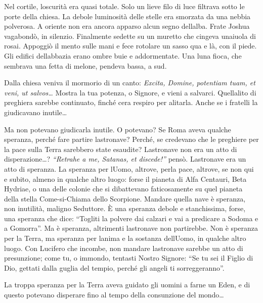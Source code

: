 Nel cortile, l\textquotesingle oscurità era quasi totale. Solo un lieve
filo di luce filtrava sotto le porte della chiesa. La debole luminosità
delle stelle era smorzata da una nebbia polverosa. A oriente non era
ancora apparso alcun segno dell\textquotesingle alba. Frate Joshua
vagabondò, in silenzio. Finalmente sedette su un muretto che cingeva
un\textquotesingle aiuola di rosai. Appoggiò il mento sulle mani e fece
rotolare un sasso qua e là, con il piede. Gli edifici
dell\textquotesingle abbazia erano ombre buie e addormentate. Una luna
fioca, che sembrava una fetta di melone, pendeva bassa, a sud.

Dalla chiesa veniva il mormorio di un canto: \emph{Excita, Domine,
	potentiam tuam, et veni, ut salvos\ldots{}} Mostra la tua potenza, o
Signore, e vieni a salvarci. Quell\textquotesingle alito di preghiera
sarebbe continuato, finché c\textquotesingle era respiro per alitarla.
Anche se i fratelli la giudicavano inutile\ldots{}

Ma non potevano giudicarla inutile. O potevano? Se Roma aveva qualche
speranza, perché fare partire l\textquotesingle astronave? Perché, se
credevano che le preghiere per la pace sulla Terra sarebbero state
esaudite? L\textquotesingle astronave non era un atto di
disperazione\ldots? \emph{``Retrahe a me, Satanas, et discede!''} pensò.
L\textquotesingle astronave era un atto di speranza. La speranza per
l\textquotesingle Uomo, altrove, perla pace, altrove, se non qui e
subito, almeno in qualche altro luogo: forse il pianeta di Alfa
Centauri, Beta Hydriae, o una delle colonie che si dibattevano
faticosamente su quel pianeta della stella Come-si-Chiama dello
Scorpione. Mandare quella nave è speranza, non inutilità, maligno
Seduttore. È una speranza debole e stanchissima, forse, una speranza che
dice: ``Togliti la polvere dai calzari e vai a predicare a Sodoma e a
Gomorra''. Ma è speranza, altrimenti l\textquotesingle astronave non
partirebbe. Non è speranza per la Terra, ma speranza per
l\textquotesingle anima e la sostanza dell\textquotesingle Uomo, in
qualche altro luogo. Con Lucifero che incombe, non mandare
l\textquotesingle astronave sarebbe un atto di presunzione; come tu, o
immondo, tentasti Nostro Signore: ``Se tu sei il Figlio di Dio, gettati
dalla guglia del tempio, perché gli angeli ti sorreggeranno''.

La troppa speranza per la Terra aveva guidato gli uomini a farne un
Eden, e di questo potevano disperare fino al tempo della consunzione del
mondo\ldots{}

